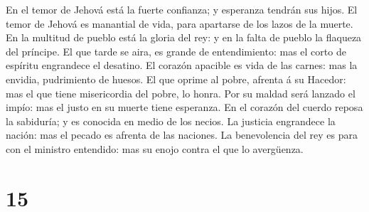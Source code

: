  En el temor de Jehová está la fuerte confianza; y
esperanza tendrán sus hijos.  El temor de Jehová es
manantial de vida, para apartarse de los lazos de la muerte.
 En la multitud de pueblo está la gloria del rey: y en la
falta de pueblo la flaqueza del príncipe.  El que tarde se
aira, es grande de entendimiento: mas el corto de espíritu engrandece el
desatino.  El corazón apacible es vida de las carnes: mas
la envidia, pudrimiento de huesos.  El que oprime al pobre,
afrenta á su Hacedor: mas el que tiene misericordia del pobre, lo honra.
 Por su maldad será lanzado el impío: mas el justo en su
muerte tiene esperanza.  En el corazón del cuerdo reposa la
sabiduría; y es conocida en medio de los necios.  La
justicia engrandece la nación: mas el pecado es afrenta de las naciones.
 La benevolencia del rey es para con el ministro entendido:
mas su enojo contra el que lo avergüenza.

\hypertarget{section-14}{%
\section{15}\label{section-14}}

